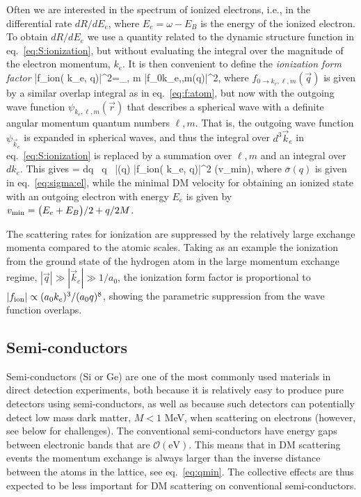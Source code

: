 Often we are interested in the spectrum of ionized electrons, i.e., in the differential rate $dR/d E_e$, where $E_e=\omega-E_B$ is the energy of the ionized electron. To obtain $dR/d E_e$ we use a quantity related to the dynamic structure function in eq.~\eqref{eq:S:ionization}, but without evaluating the integral over the magnitude of the electron momentum, $k_e$. It is then convenient to define the {\em ionization form factor}
\beq
\label{eq:f:ion}
\big|f_{\rm ion}( k_e,  q)\big|^2=\sum_{\ell, m} \big|f_{0\to k_e,\ell,m}(\vec q)|^2,
\eeq
where $f_{0\to  k_e,\ell,m}(\vec q)$ is given by a similar overlap integral as in eq.~\eqref{eq:f:atom}, but now with the outgoing wave function $\psi_{ k_e,\ell,m}(\vec r)$ that describes a spherical wave with a definite angular momentum quantum numbers $\ell, m$. That is, the outgoing wave function $\psi_{\vec k_e}$ is expanded in spherical waves, and thus the integral over $d^3\vec k_e$ in eq.~\eqref{eq:S:ionization} is replaced by a summation over $\ell, m$ and an integral over $d k_e$. This gives
\beq
{}=  \int dq \, q \, \bar \sigma(q)  \big|f_{\rm ion}( k_e,  q)\big|^2 \eta(v_{\rm min}),
\eeq
where $\bar \sigma(q)$ is given in eq.~\eqref{eq:sigma:el}, while the minimal DM velocity for obtaining an ionized state with an outgoing electron with energy $E_e$ is given by $v_{\rm min}=\big(E_e+E_B\big)/2 +q/2M$.

The scattering rates for ionization are suppressed by the relatively large exchange momenta compared to the atomic scales. 
Taking as an example the ionization from the ground state of the hydrogen atom in the large momentum exchange regime,  $|\vec q|\gg |\vec k_e| \gg 1/a_0$,  the ionization form factor is proportional to $|f_{\rm ion}|\propto (a_0  k_e)^3/(a_0 q)^8$, showing the parametric suppression from the wave function overlaps. 


\subsection{Semi-conductors} 
Semi-conductors (Si or Ge) are one of the most commonly used materials in direct detection experiments, both because it is relatively easy to produce pure detectors using semi-conductors, as well as because such detectors can potentially detect low mass dark matter, $M<1$ MeV, when scattering on electrons (however, see below for challenges).
The conventional semi-conductors have energy gaps between electronic bands that are ${\mathcal O}(\text{eV})$. This means that in DM scattering events the momentum exchange is always larger than the inverse distance between the atoms in the lattice, see eq.~\eqref{eq:qmin}. The collective effects are thus expected to be less important for DM scattering on conventional semi-conductors. 

